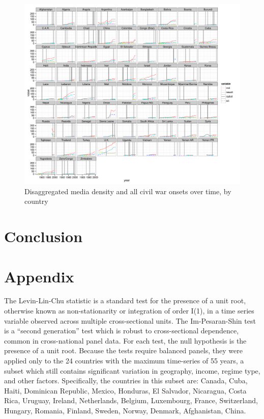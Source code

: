 \documentclass[11pt,article,oneside]{memoir}
\makeatletter
\def\maxwidth{\ifdim\Gin@nat@width>\linewidth\linewidth
\else\Gin@nat@width\fi}
\let\Oldincludegraphics\includegraphics
\renewcommand{\includegraphics}[1]{\Oldincludegraphics[width=\maxwidth]{#1}}
\makeatother
\begin{document}
\clearpage

\begin{figure}[htbp]
\centering
\includegraphics{figure/full_panel_plot.pdf}
\caption{Disaggregated media density and all civil war onsets over time,
by country}
\end{figure}

\section{Conclusion}\label{conclusion}

\section{Appendix}\label{appendix}

The Levin-Lin-Chu statistic is a standard test for the presence of a
unit root, otherwise known as non-stationarity or integration of order
I(1), in a time series variable observed across multiple cross-sectional
units. The Im-Pesaran-Shin test is a ``second generation'' test which is
robust to cross-sectional dependence, common in cross-national panel
data. For each test, the null hypothesis is the presence of a unit root.
Because the tests require balanced panels, they were applied only to the
24 countries with the maximum time-series of 55 years, a subset which
still contains significant variation in geography, income, regime type,
and other factors. Specifically, the countries in this subset are:
Canada, Cuba, Haiti, Dominican Republic, Mexico, Honduras, El Salvador,
Nicaragua, Costa Rica, Uruguay, Ireland, Netherlands, Belgium,
Luxembourg, France, Switzerland, Hungary, Romania, Finland, Sweden,
Norway, Denmark, Afghanistan, China.
\end{document}
